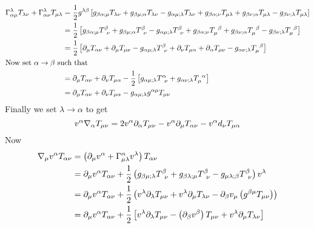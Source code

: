 \documentclass{article}
\begin{document}
	\begin{align*}
		\Gamma_{\alpha\mu}^\lambda T_{\lambda\nu} + \Gamma_{\alpha\nu}^\lambda T_{\mu\lambda} &= \frac12 g^{\lambda\beta} \left[ g_{\beta\alpha;\mu} T_{\lambda\nu} + g_{\beta\mu;\alpha} T_{\lambda\nu} - g_{\alpha\mu;\lambda} T_{\lambda\nu} + g_{\beta\alpha;\nu} T_{\mu\lambda} + g_{\beta\nu;\alpha} T_{\mu\lambda} - g_{\beta\nu;\lambda} T_{\mu\lambda}\right] \\
		&= \frac12\left[ g_{\beta\alpha;\mu} T_{\,\,\,\nu}^\beta + g_{\beta\mu;\alpha} T_{\,\,\,\nu}^\beta - g_{\alpha\mu;\lambda} T_{\,\,\,\nu}^\beta + g_{\beta\alpha;\nu} T_{\mu}^{\,\,\,\beta} + g_{\beta\nu;\alpha} T_{\mu}^{\,\,\,\beta} - g_{\beta\nu;\lambda} T_{\mu}^{\,\,\,\beta}\right] \\
		&= \frac12 \left[ \partial_\mu T_{\alpha\nu} + \partial_\mu T_{\mu\nu} - g_{\alpha\mu;\lambda}T_{\,\,\,\nu}^\beta + \partial_\nu T_{\mu\alpha} + \partial_\alpha T_{\mu\nu} - g_{\alpha\nu;\lambda} T_{\mu}^{\,\,\,\beta} \right] \\
		\intertext{Now set $\alpha \to \beta$ such that}
		&= \partial_\mu T_{\alpha\nu} + \partial_\nu T_{\mu\alpha} -\frac12 \left[ g_{\alpha\mu;\lambda}T^\alpha_{\,\,\,\nu} +g_{\alpha\nu;\lambda}T^{\,\,\,\alpha}_{\mu}  \right] \\
		&=  \partial_\mu T_{\alpha\nu} + \partial_\nu T_{\mu\alpha} - g_{\alpha\mu;\lambda}g^{\alpha\mu} T_{\mu\nu}
	\end{align*}
	Finally we set $\lambda \to \alpha$ to get
	$$ v^\alpha \nabla_\alpha T_{\mu\nu} = 2v^\alpha \partial_\alpha T_{\mu\nu} - v^\alpha \partial_\mu T_{\alpha\nu} - v^\alpha d_\nu T_{\mu\alpha}$$
	Now
	\begin{align*}
		\nabla_\mu v^\alpha  T_{\alpha\nu} &= \left( \partial_{\mu} v^\alpha + \Gamma_{\mu\lambda}^\alpha v^\lambda \right) T_{\alpha\nu} \\
		&= \partial_\mu v^\alpha T_{\alpha\nu} + \frac12 \left( g_{\beta\mu;\lambda} T^\beta_{\,\,\,\nu} + g_{\beta\lambda;\mu}T^\beta_{\,\,\,\nu} - g_{\mu\lambda;\beta} T^{\beta}_{\,\,\,\nu}\right)v^\lambda \\
		&= \partial_\mu v^\alpha T_{\alpha\nu} + \frac12 \left(  v^\lambda \partial_\lambda T_{\mu\nu} + v^\lambda \partial_\mu T_{\lambda\nu} - \partial_\beta v_\mu  \left( g^{\beta\mu}T_{\mu\nu}\right)\right) \\
		&= \partial_\mu v^\alpha T_{\alpha\nu} + \frac12 \left[ v^\lambda \partial_\lambda T_{\mu\nu} - \left( \partial_\beta v^\beta \right) T_{\mu\nu} + v^\lambda \partial_\mu T_{\lambda\nu} \right]
	\end{align*}
\end{document}
